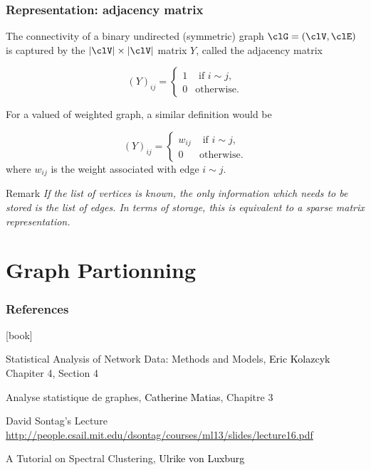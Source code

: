 \documentclass{beamer}\usepackage[]{graphicx}\usepackage[]{color}
\begin{document}
\begin{frame}
  \frametitle{Representation: adjacency matrix}

The connectivity of a binary undirected (symmetric) graph $\clG = (\clV,\clE)$ is captured by the $|\clV|\times |\clV|$ matrix $Y$, called the adjacency matrix

$$
  (Y)_{ij} = \begin{cases}
  1  & \text{ if } i \sim j,\\
  0  & \text{otherwise}.
\end{cases}
$$

For a valued of weighted graph, a similar definition would be

$$
  (Y)_{ij} = \begin{cases}
  w_{ij}  & \text{ if } i \sim j,\\
  0  & \text{otherwise}.
\end{cases}
$$
where $w_{ij}$ is the weight associated with edge $i\sim j$.

  \begin{block}{Remark}
    \it If the list of vertices is known, the only information which needs to be stored is the list of edges. In terms of storage, this is equivalent to a sparse matrix representation.
  \end{block}

\end{frame}

\section{Graph Partionning}

\begin{frame} 
  \frametitle{References}

    \begin{thebibliography}{99}
      [book]

     Statistical Analysis of Network Data: Methods and Models,
    \newblock \textcolor{black}{Eric Kolazcyk}
    \newblock \alert{Chapiter 4, Section 4}

     Analyse statistique de graphes, 
    \newblock \textcolor{black}{Catherine Matias}, \alert{Chapitre 3}

     David Sontag's Lecture
    \newblock \url{http://people.csail.mit.edu/dsontag/courses/ml13/slides/lecture16.pdf}
    
     A Tutorial on Spectral Clustering, 
    \newblock \textcolor{black}{Ulrike von Luxburg}

    \end{thebibliography}

\end{frame}
\end{document}
